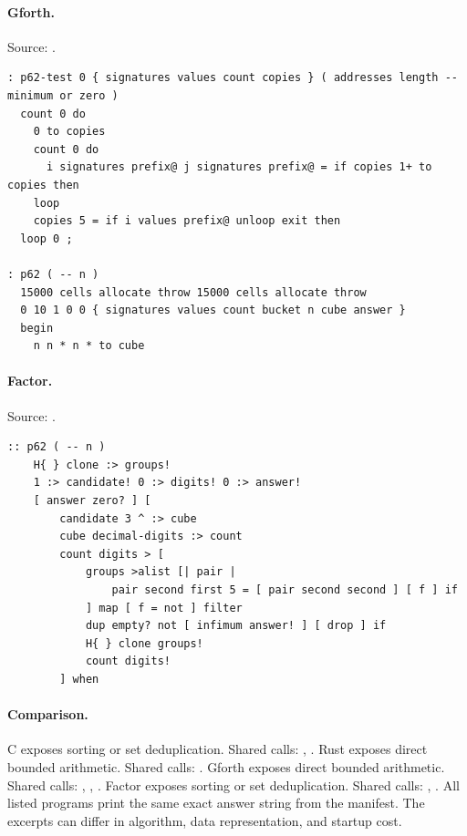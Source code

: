 \paragraph{Gforth.} Source: .
\begin{lstlisting}
: p62-test 0 { signatures values count copies } ( addresses length -- minimum or zero )
  count 0 do
    0 to copies
    count 0 do
      i signatures prefix@ j signatures prefix@ = if copies 1+ to copies then
    loop
    copies 5 = if i values prefix@ unloop exit then
  loop 0 ;

: p62 ( -- n )
  15000 cells allocate throw 15000 cells allocate throw
  0 10 1 0 0 { signatures values count bucket n cube answer }
  begin
    n n * n * to cube
\end{lstlisting}

\paragraph{Factor.} Source: .
\begin{lstlisting}
:: p62 ( -- n )
    H{ } clone :> groups!
    1 :> candidate! 0 :> digits! 0 :> answer!
    [ answer zero? ] [
        candidate 3 ^ :> cube
        cube decimal-digits :> count
        count digits > [
            groups >alist [| pair |
                pair second first 5 = [ pair second second ] [ f ] if
            ] map [ f = not ] filter
            dup empty? not [ infimum answer! ] [ drop ] if
            H{ } clone groups!
            count digits!
        ] when
\end{lstlisting}

\paragraph{Comparison.}
C exposes sorting or set deduplication. Shared calls: \texttt{}, \texttt{}. Rust exposes direct bounded arithmetic. Shared calls: \texttt{}. Gforth exposes direct bounded arithmetic. Shared calls: \texttt{}, \texttt{}, \texttt{}. Factor exposes sorting or set deduplication. Shared calls: \texttt{}, \texttt{}.
All listed programs print the same exact answer string from the manifest. The excerpts can differ in algorithm, data representation, and startup cost.

